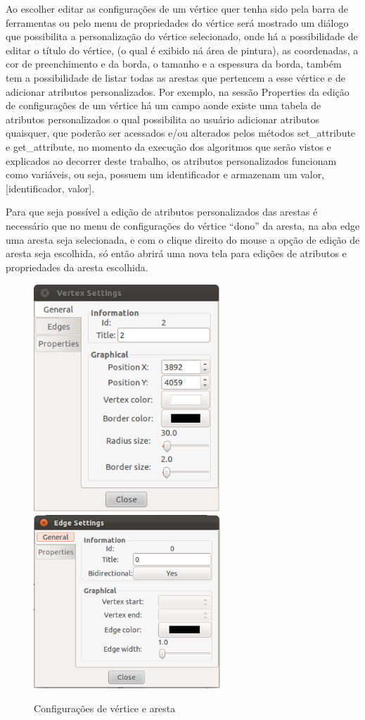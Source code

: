 \documentclass[a4paper]{abnt}
\begin{document}
Ao escolher editar as configurações de um vértice quer tenha sido pela barra de ferramentas ou pelo menu de propriedades do vértice será mostrado um diálogo que possibilita a personalização do vértice selecionado, onde há a possibilidade de editar o título do vértice, (o qual é exibido ná área de pintura), as coordenadas, a cor de preenchimento e da borda, o tamanho e a espessura da borda, também tem a possibilidade de listar todas as arestas que pertencem a esse vértice e de adicionar atributos personalizados. Por exemplo, na sessão Properties da edição de configurações de um vértice há um campo aonde existe uma tabela de atributos personalizados o qual possibilita ao usuário adicionar atributos quaisquer, que poderão ser acessados e/ou alterados pelos métodos set\_attribute e get\_attribute, no momento da execução dos algoritmos que serão vistos e explicados ao decorrer deste trabalho, os atributos personalizados funcionam como variáveis, ou seja, possuem um identificador e armazenam um valor, [identificador, valor].

Para que seja possível a edição de atributos personalizados das arestas é necessário que no menu de configurações do vértice “dono” da aresta, na aba edge uma aresta seja selecionada, e com o clique direito do mouse a opção de edição de aresta seja escolhida, só então abrirá uma nova tela para edições de atributos e propriedades da aresta escolhida.

\begin{figure}[htb]
    \centering
	\includegraphics[width=7cm]{vertex_settings.png}
    \includegraphics[width=7cm]{edge_settings.png}
	\caption{Configurações de vértice e aresta}
	\label{img_vertex_and_edges_settings}
\end{figure}
\end{document}
